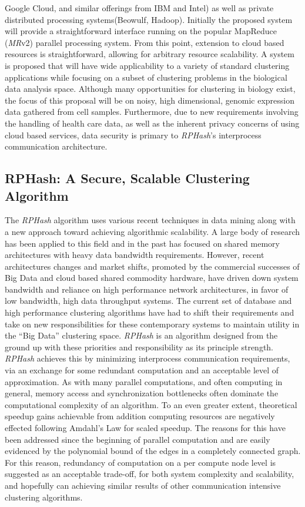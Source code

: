 \documentclass[a4paper,10pt]{article}
\begin{document}
Google Cloud, and similar offerings from IBM and Intel) as well as private
distributed processing systems(Beowulf, Hadoop).  Initially the proposed system
will provide a straightforward interface running on the popular MapReduce
(\emph{MR}v2)\cite{mapreduce,hadoop} parallel processing system.  From this
point, extension to cloud based resources is straightforward, allowing for
arbitrary resource scalability.  A system is proposed that will have wide
applicability to a variety of standard clustering applications while focusing
on a subset of clustering problems in the biological data analysis space.
Although many opportunities for clustering in biology exist, the focus of
this proposal will be on noisy, high dimensional, genomic expression data
gathered from cell samples\cite{anders2010differential}.  Furthermore, due
to new requirements involving the handling of health care data, as well as
the inherent privacy concerns of using cloud based services, data security
is primary to \emph{RPHash}'s interprocess communication architecture.

\subsection{RPHash: A Secure, Scalable Clustering Algorithm} The
\emph{RPHash} algorithm uses various recent techniques in data mining
along with a new approach toward achieving algorithmic scalability.
A large body of research has been applied to this field and in the past
has focused on shared memory architectures with heavy data bandwidth
requirements\cite{Zaki2000,distributeddata,parclus}.  However, recent
architectures changes and market shifts, promoted by the commercial successes
of Big Data and cloud based shared commodity hardware, have driven down
system bandwidth and reliance on high performance network architectures, in
favor of low bandwidth, high data throughput systems\cite{mapreduce,hadoop}.
The current set of database and high performance clustering algorithms have
had to shift their requirements and take on new responsibilities for these
contemporary systems to maintain utility in the ``Big Data'' clustering space.
\emph{RPHash} is an algorithm designed from the ground up with these
priorities and responsibility as its principle strength.  \emph{RPHash}
achieves this by minimizing interprocess communication requirements,
via an exchange for some redundant computation and an acceptable level
of approximation.  As with many parallel computations, and often computing
in general, memory access and synchronization bottlenecks often dominate
the computational complexity of an algorithm.  To an even greater extent,
theoretical speedup gains achievable from addition computing resources are
negatively effected following Amdahl's Law for scaled speedup\cite{Amdahl}.
The reasons for this have been addressed since the beginning of parallel
computation and are easily evidenced by the polynomial bound of the edges in
a completely connected graph.  For this reason, redundancy of computation
on a per compute node level is suggested as an acceptable trade-off, for
both system complexity and scalability, and hopefully can achieving similar
results of other communication intensive clustering algorithms.
\end{document}
